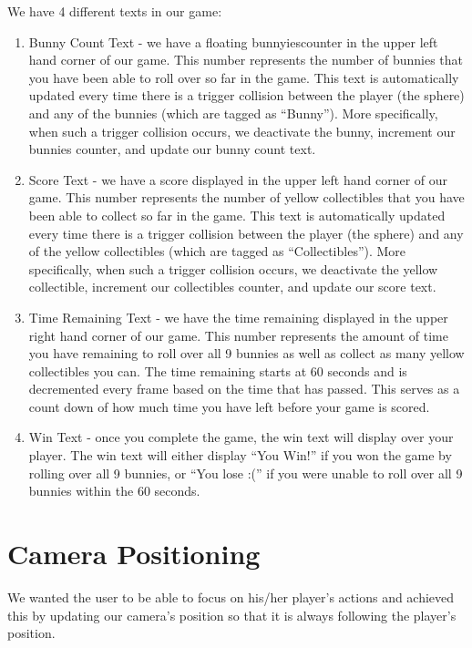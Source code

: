 \documentclass[12pt]{article}
\begin{document}
We have 4 different texts in our game:

\begin{enumerate}
  \item Bunny Count Text - we have a floating bunnyiescounter in the upper left hand corner of our game. This number represents the number of bunnies that you have been able to roll over so far in the game. This text is automatically updated every time there is a trigger collision between the player (the sphere) and any of the bunnies (which are tagged as ``Bunny''). More specifically, when such a trigger collision occurs, we deactivate the bunny, increment our bunnies counter, and update our bunny count text.
  \item Score Text - we have a score displayed in the upper left hand corner of our game. This number represents the number of yellow collectibles that you have been able to collect so far in the game. This text is automatically updated every time there is a trigger collision between the player (the sphere) and any of the yellow collectibles (which are tagged as ``Collectibles''). More specifically, when such a trigger collision occurs, we deactivate the yellow collectible, increment our collectibles counter, and update our score text.
  \item Time Remaining Text - we have the time remaining displayed in the upper right hand corner of our game. This number represents the amount of time you have remaining to roll over all 9 bunnies as well as collect as many yellow collectibles you can. The time remaining starts at 60 seconds and is decremented every frame based on the time that has passed. This serves as a count down of how much time you have left before your game is scored.
  \item Win Text - once you complete the game, the win text will display over your player. The win text will either display ``You Win!'' if you won the game by rolling over all 9 bunnies, or ``You lose :('' if you were unable to roll over all 9 bunnies within the 60 seconds.
\end{enumerate}




\section{Camera Positioning}
  We wanted the user to be able to focus on his/her player's actions and achieved this by updating our camera's position so that it is always following the player's position. 
\end{document}

